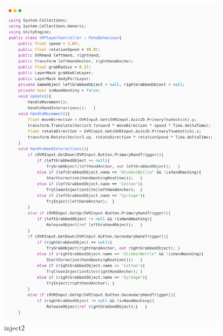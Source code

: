 \newpage
\begin{figure}[h] 
	\centering
	\includegraphics[width=1\textwidth, height=0.7\textheight]{Images/inject1.png}
	\caption{inject2}
	\label{fig:Hands Washing}
\end{figure}
\newpage
